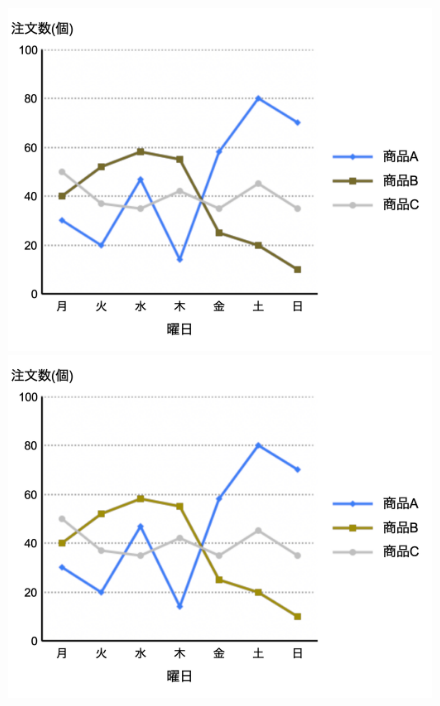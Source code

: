 \begin{figure}[H]
\begin{minipage}[b]{.23\textwidth}
        \includegraphics[keepaspectratio,width=\textwidth]{../../10_UniversalDesign/no2_line_RC_P.png}
    \end{minipage}
    \begin{minipage}[b]{.23\textwidth}
        \centering
        \includegraphics[keepaspectratio,width=\textwidth]{../../10_UniversalDesign/no2_line_RC_D.png}
    \end{minipage}
    \begin{minipage}[b]{.23\textwidth}
        \centering

\end{minipage}
\end{figure}
